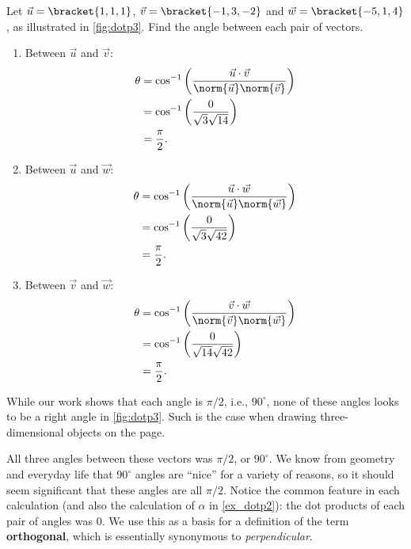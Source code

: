\begin{example}\label{ex_dotp3}%
Let $\vec u = \bracket{1,1,1}$, $\vec v = \bracket{-1,3,-2}$ and $\vec w = \bracket{-5,1,4}$, as illustrated in \autoref{fig:dotp3}. Find the angle between each pair of vectors.
\solution
\begin{enumerate}
	\item Between $\vec u$ and $\vec v$:\vspace{-\baselineskip}
	\begin{align*}
		\theta &= \cos^{-1}\left(\frac{\vec u\cdot\vec v}{\norm{\vec u}\norm{\vec v}}\right)\\
		&= \cos^{-1}\left(\frac{0}{\sqrt{3}\sqrt{14}}\right)\\
		&= \frac{\pi}2.
	\end{align*}
	\item	Between $\vec u$ and $\vec w$:\vspace{-\baselineskip}
	\begin{align*}
		\theta &= \cos^{-1}\left(\frac{\vec u\cdot\vec w}{\norm{\vec u}\norm{\vec w}}\right)\\
		&= \cos^{-1}\left(\frac{0}{\sqrt{3}\sqrt{42}}\right)\\
		&= \frac{\pi}2.
	\end{align*}
	\item	Between $\vec v$ and $\vec w$:\vspace{-\baselineskip}
	\begin{align*}
		\theta &= \cos^{-1}\left(\frac{\vec v\cdot\vec w}{\norm{\vec v}\norm{\vec w}}\right)\\
		&= \cos^{-1}\left(\frac{0}{\sqrt{14}\sqrt{42}}\right)\\
		&= \frac{\pi}2.
	\end{align*}
\end{enumerate}
While our work shows that each angle is $\pi/2$, i.e.,  $90^\circ$, none of these angles looks to be a right angle in \autoref{fig:dotp3}. Such is the case when drawing three-dimensional objects on the page.
\end{example}

All three angles between these vectors was $\pi/2$, or $90^\circ$. We know from geometry and everyday life that $90^\circ$ angles are ``nice'' for a variety of reasons, so it should seem significant that these angles are all $\pi/2$. Notice the common feature in each calculation (and also the calculation of $\alpha$ in \autoref{ex_dotp2}): the dot products of each pair of angles was 0. We use this as a basis for a definition of the term \textbf{orthogonal}, which is essentially synonymous to \emph{perpendicular}.

